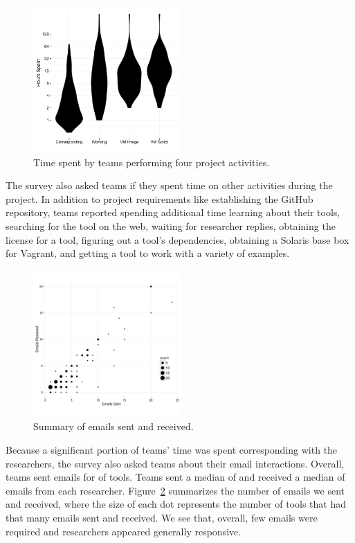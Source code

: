 \documentclass[10pt,conference]{IEEEtran}
\begin{document}
\begin{figure}[!ht]
  \centering
    \includegraphics[width=0.5\textwidth]{durations.pdf}
  \caption{Time spent by teams performing four project activities.}\label{fig:duration}
\end{figure}

The survey also asked teams if they spent
time on other activities during the project.
In addition to project requirements like establishing
the GitHub repository, teams 
reported spending additional time 
learning about their tools,
searching for the tool on the web,
waiting for researcher replies,
obtaining the license for a tool,
figuring out a tool's dependencies,
obtaining a Solaris base box for Vagrant,
and
getting a tool to work with a variety of examples.

\begin{figure}[!ht]
  \centering
    \includegraphics[width=0.5\textwidth]{emailPlot.pdf}
  \caption{Summary of emails sent and received.}\label{fig:emailSnR}
\end{figure}

Because a significant portion of teams' time was
spent corresponding with the researchers,
the survey also asked teams about their email interactions.
Overall, teams sent emails for \emailsPercentSent of tools.
Teams sent a median of \emailsSent and received 
a median of \emailsRecieved emails from each researcher.
Figure~\ref{fig:emailSnR} summarizes the number of emails
we sent and received, where the size of each dot
represents the number of tools that had
that many emails sent and received.
We see that, overall, few emails were required
and researchers appeared generally responsive.
\end{document}
